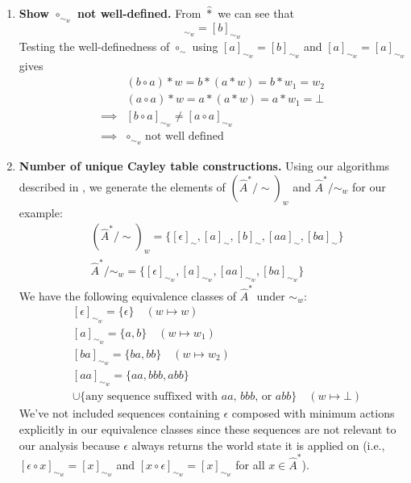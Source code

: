 \begin{proofE}
\begin{enumerate}[(1)]
    \item \textbf{Show $\circ_{\sim_{w}}$ not well-defined.}
    From $\hat{\ast}$ we can see that
    \begin{equation}
        [a]_{\sim_{w}} = [b]_{\sim_{w}}
    \end{equation}
    Testing the well-definedness of $\circ_{\sim}$ using $[a]_{\sim_{w}} = [b]_{\sim_{w}}$ and $[a]_{\sim_{w}} = [a]_{\sim_{w}}$ gives
    \begin{align}
        & (b \circ a) \ast w = b \ast (a \ast w) = b \ast w_{1} = w_{2} \\
        & (a \circ a) \ast w = a \ast (a \ast w) = a \ast w_{1} = \bot \\
        \implies & [b \circ a]_{\sim_{w}} \neq [a \circ a]_{\sim_{w}} \\
        \implies & \circ_{\sim_{w}} \; \text{not well defined}
    \end{align}

    \item \textbf{Number of unique Cayley table constructions.}
    Using our algorithms described in , we generate the elements of $(\hat{A}^{*}/\sim)_{w}$ and $\hat{A}^{*}/\sim_{w}$ for our example:
    \begin{align}
        & (\hat{A}^{*}/\sim)_{w} = \{ [\epsilon]_{\sim}, [a]_{\sim}, [b]_{\sim}, [aa]_{\sim}, [ba]_{\sim} \} \\
        & \hat{A}^{*}/\sim_{w} = \{ [\epsilon]_{\sim_{w}}, [a]_{\sim_{w}}, [aa]_{\sim_{w}}, [ba]_{\sim_{w}} \}
    \end{align}
    We have the following equivalence classes of $\hat{A}^{*}$ under $\sim_{w}$:
    \begin{align}
        & [\epsilon]_{\sim_{w}} = \{ \epsilon \} \quad (w \mapsto w) \\
        & [a]_{\sim_{w}} = \{ a, b \} \quad (w \mapsto w_{1}) \\
        & [ba]_{\sim_{w}} = \{ ba, bb \} \quad (w \mapsto w_{2}) \\
        & [aa]_{\sim_{w}} = \{ aa, bbb, abb \} \\
        & \cup \{ \text{any sequence suffixed with $aa$, $bbb$, or $abb$} \} \quad (w \mapsto \bot)
    \end{align}
    We've not included sequences containing $\epsilon$ composed with minimum actions explicitly in our equivalence classes since these sequences are not relevant to our analysis because $\epsilon$ always returns the world state it is applied on (i.e., $[\epsilon \circ x]_{\sim_{w}} = [x]_{\sim_{w}}$ and $[x \circ \epsilon]_{\sim_{w}} = [x]_{\sim_{w}}$ for all $x \in \hat{A}^{*}$).


\end{enumerate}
\end{proofE}
